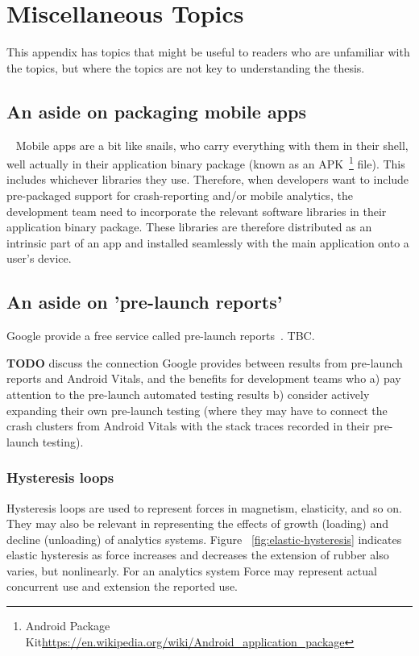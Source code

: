 \chapter{Miscellaneous Topics}
This appendix has topics that might be useful to readers who are unfamiliar with the topics, but where the topics are not key to understanding the thesis. 

\section{An aside on packaging mobile apps}~\label{section-packaging-mobile-apps}
Mobile apps are a bit like snails, who carry everything with them in their shell, well actually in their application binary package (known as an APK~\footnote{Android Package Kit\url{https://en.wikipedia.org/wiki/Android_application_package}} file). This includes whichever libraries they use. Therefore, when developers want to include pre-packaged support for crash-reporting and/or mobile analytics, the development team need to incorporate the relevant software libraries in their application binary package. These libraries are therefore distributed as an intrinsic part of an app and installed seamlessly with the main application onto a user's device.

\section{An aside on 'pre-launch reports'}
Google provide a free service called pre-launch reports~\cite{google_use_pre_launch_reports}. TBC.

\textbf{TODO} discuss the connection Google provides between results from pre-launch reports and Android Vitals, and the benefits for development teams who a) pay attention to the pre-launch automated testing results b) consider actively expanding their own pre-launch testing (where they may have to connect the crash clusters from Android Vitals with the stack traces recorded in their pre-launch testing).

\subsection{Hysteresis loops}

Hysteresis loops are used to represent forces in magnetism, elasticity, and so on. They may also be relevant in representing the effects of growth (loading) and decline (unloading) of analytics systems. Figure ~\ref{fig:elastic-hysteresis} indicates elastic hysteresis as force increases and decreases the extension of rubber also varies, but nonlinearly. For an analytics system Force may represent actual concurrent use and extension the reported use.

